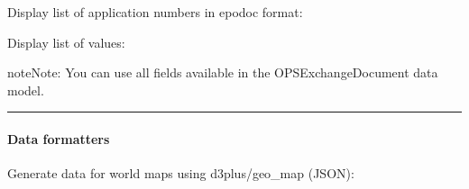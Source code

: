 \documentclass[letterpaper,10pt,english]{sphinxmanual}
\begin{document}
Display list of application numbers in epodoc format:

\begin{sphinxVerbatim}[commandchars=\\\{\}]
    
\end{sphinxVerbatim}

Display list of  values:

\begin{sphinxVerbatim}[commandchars=\\\{\}]
      
\end{sphinxVerbatim}

\begin{sphinxadmonition}{note}{Note:}
You can use all fields available in the OPSExchangeDocument data model.
\end{sphinxadmonition}


\bigskip\hrule\bigskip



\paragraph{Data formatters}
\label{\detokenize{usage/adhoc:data-formatters}}
Generate data for world maps using d3plus/geo\_map (JSON):
\end{document}
